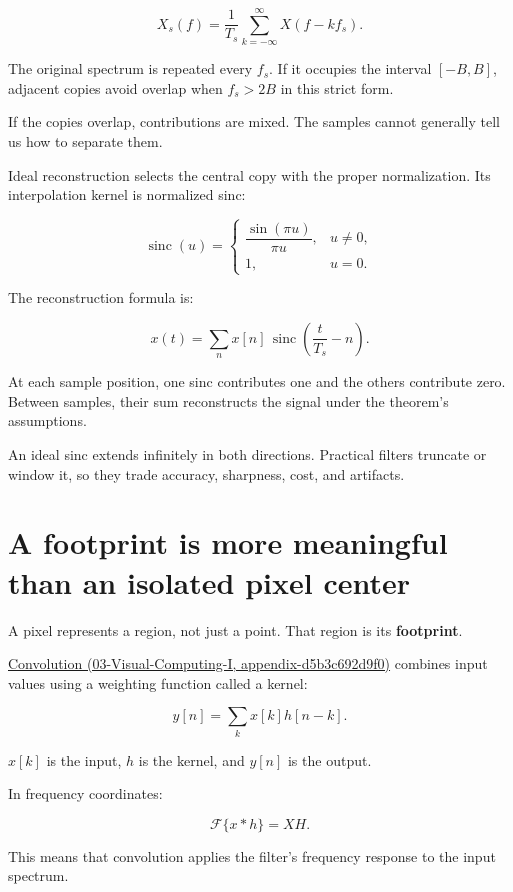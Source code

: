 \[
X_s(f)=\frac1{T_s}
\sum_{k=-\infty}^{\infty}X(f-kf_s).
\]

The original spectrum is repeated every \(f_s\). If it occupies the interval \([-B,B]\), adjacent copies avoid overlap when \(f_s>2B\) in this strict form.

If the copies overlap, contributions are mixed. The samples cannot generally tell us how to separate them.

Ideal reconstruction selects the central copy with the proper normalization. Its interpolation kernel is normalized sinc:

\[
\operatorname{sinc}(u)=
\begin{cases}
\dfrac{\sin(\pi u)}{\pi u},&u\ne0,\\
1,&u=0.
\end{cases}
\]

The reconstruction formula is:

\[
x(t)=\sum_n x[n]\,
\operatorname{sinc}\left(\frac{t}{T_s}-n\right).
\]

At each sample position, one sinc contributes one and the others contribute zero. Between samples, their sum reconstructs the signal under the theorem's assumptions.

An ideal sinc extends infinitely in both directions. Practical filters truncate or window it, so they trade accuracy, sharpness, cost, and artifacts.

\section{A footprint is more meaningful than an isolated pixel center}\label{04-visual-computing-ii-ch043-a-footprint-is-more-meaningful-than-an-isolated-pixel-center}

A pixel represents a region, not just a point. That region is its \textbf{footprint}.

\href{../03-Visual-Computing-I/main.pdf\#nameddest=appendix-d5b3c692d9f0}{Convolution (03-Visual-Computing-I, appendix-d5b3c692d9f0)} combines input values using a weighting function called a kernel:

\[
y[n]=\sum_k x[k]h[n-k].
\]

\(x[k]\) is the input, \(h\) is the kernel, and \(y[n]\) is the output.

In frequency coordinates:

\[
\mathcal F\{x*h\}=XH.
\]

This means that convolution applies the filter's frequency response to the input spectrum.

